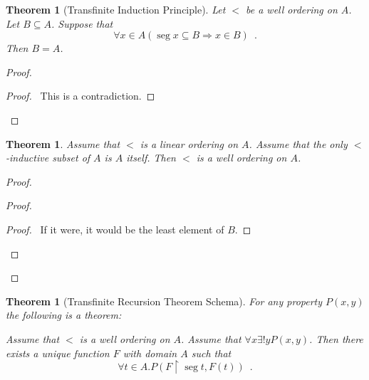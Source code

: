 \documentclass{article}
\let\qed\relax
\newtheorem{theorem}[axiom]{Theorem}
\theoremstyle{definition}
\newcommand{\seg}{\ensuremath{\operatorname{seg}}}
\begin{document}
    \begin{theorem}[Transfinite Induction Principle]
        Let $<$ be a well ordering on $A$. Let $B \subseteq A$. Suppose that
        \[ \forall x \in A (\seg x \subseteq B \Rightarrow x \in B) \enspace . \]
        Then $B = A$.
    \end{theorem}

    \begin{proof}
        \pf
        \step{3}{$\seg t \subseteq B$}
        \qedstep
        \begin{proof}
            \pf\ This is a contradiction.
        \end{proof}
        \qed
    \end{proof}

    \begin{theorem}
        Assume that $<$ is a linear ordering on $A$. Assume that the only $<$-inductive subset of $A$ is $A$
        itself. Then $<$ is a well ordering on $A$.
    \end{theorem}

    \begin{proof}
        \pf
        \begin{proof}
            \step{b}{\assume{$\seg t \subseteq A - B$}}
            \begin{proof}
                \pf\ If it were, it would be the least element of $B$.
            \end{proof}
        \end{proof}
        \qed
    \end{proof}

    \begin{theorem}[Transfinite Recursion Theorem Schema]
        For any property $P(x,y)$ the following is a theorem:

        Assume that $<$ is a well ordering on $A$. Assume that $\forall x \exists ! y P(x,y)$.
        Then there exists a unique function $F$ with domain $A$ such that
        \[ \forall t \in A. P(F \restriction \seg t, F(t)) \enspace . \]
    \end{theorem}
\end{document}
